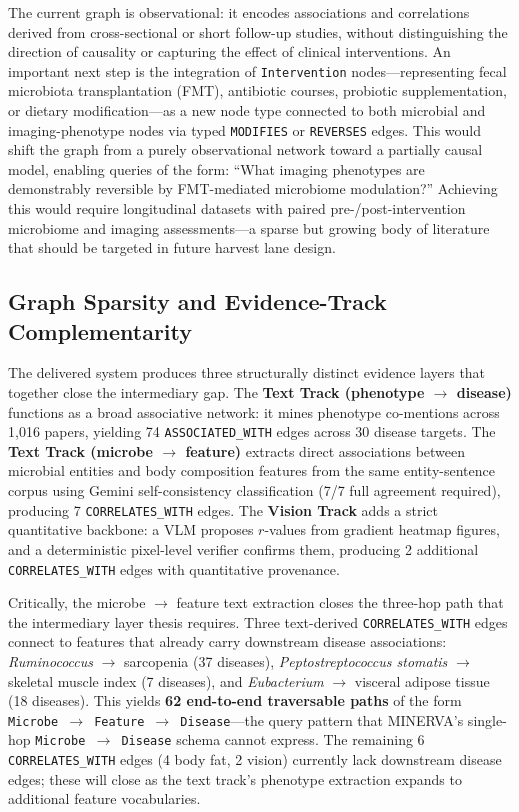 \documentclass[12pt, letterpaper]{article}
\begin{document}
The current graph is observational: it encodes associations and correlations derived from cross-sectional or short follow-up studies, without distinguishing the direction of causality or capturing the effect of clinical interventions. An important next step is the integration of \texttt{Intervention} nodes---representing fecal microbiota transplantation (FMT), antibiotic courses, probiotic supplementation, or dietary modification---as a new node type connected to both microbial and imaging-phenotype nodes via typed \texttt{MODIFIES} or \texttt{REVERSES} edges. This would shift the graph from a purely observational network toward a partially causal model, enabling queries of the form: ``What imaging phenotypes are demonstrably reversible by FMT-mediated microbiome modulation?'' Achieving this would require longitudinal datasets with paired pre-/post-intervention microbiome and imaging assessments---a sparse but growing body of literature that should be targeted in future harvest lane design.

\subsection{Graph Sparsity and Evidence-Track Complementarity}

The delivered system produces three structurally distinct evidence layers that together close the intermediary gap. The \textbf{Text Track (phenotype $\to$ disease)} functions as a broad associative network: it mines phenotype co-mentions across 1,016 papers, yielding 74 \texttt{ASSOCIATED\_WITH} edges across 30 disease targets. The \textbf{Text Track (microbe $\to$ feature)} extracts direct associations between microbial entities and body composition features from the same entity-sentence corpus using Gemini self-consistency classification (7/7 full agreement required), producing 7 \texttt{CORRELATES\_WITH} edges. The \textbf{Vision Track} adds a strict quantitative backbone: a VLM proposes $r$-values from gradient heatmap figures, and a deterministic pixel-level verifier confirms them, producing 2 additional \texttt{CORRELATES\_WITH} edges with quantitative provenance.

Critically, the microbe $\to$ feature text extraction closes the three-hop path that the intermediary layer thesis requires. Three text-derived \texttt{CORRELATES\_WITH} edges connect to features that already carry downstream disease associations: \textit{Ruminococcus} $\to$ sarcopenia (37 diseases), \textit{Peptostreptococcus stomatis} $\to$ skeletal muscle index (7 diseases), and \textit{Eubacterium} $\to$ visceral adipose tissue (18 diseases). This yields \textbf{62 end-to-end traversable paths} of the form \texttt{Microbe $\to$ Feature $\to$ Disease}---the query pattern that MINERVA's single-hop \texttt{Microbe $\to$ Disease} schema cannot express. The remaining 6 \texttt{CORRELATES\_WITH} edges (4 body fat, 2 vision) currently lack downstream disease edges; these will close as the text track's phenotype extraction expands to additional feature vocabularies.
\end{document}
